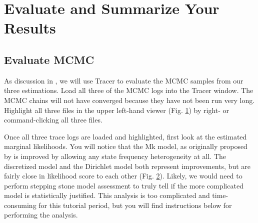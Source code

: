 \bigskip
\section{Evaluate and Summarize Your Results}\label{sec:trace}


\medskip
\subsection{Evaluate MCMC}\label{subsub:Exercise-EvalMCMC}

As discussion in , we will use Tracer to evaluate the MCMC samples from our three estimations. 
Load all three of the MCMC logs into the Tracer window.
The MCMC chains will not have converged because they have not been run very long. 
Highlight all three files in the upper left-hand viewer (Fig. \ref{fig:tracer-files}) by right- or command-clicking all three files.

\begin{figure}[h!]
\label{fig:tracer-files}
\end{figure}

Once all three trace logs are loaded and highlighted, first look at the estimated marginal likelihoods.
You will notice that the Mk model, as originally proposed by \citep{lewis01} is improved by allowing any state frequency heterogeneity at all. 
The discretized model and the Dirichlet model both represent improvements, but are fairly close in likelihood score to each other (Fig. \ref{fig:tracer-llik}).
Likely, we would need to perform stepping stone model assessment to truly tell if the more complicated model is statistically justified.
This analysis is too complicated and time-consuming for this tutorial period, but you will find instructions below for performing the analysis. \par
\begin{figure}[h!]
\label{fig:tracer-llik}
\end{figure}

